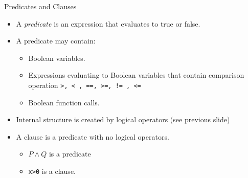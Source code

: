 \documentclass{beamer}
\begin{document}
\begin{frame}[fragile]{Predicates and Clauses}
  \begin{itemize}
  \item A {\em predicate} is an expression that evaluates to true or
    false.
   \item A predicate may contain:
     \begin{itemize}
     \item Boolean variables.
     \item Expressions evaluating to  Boolean variables that contain
       comparison operation {\tt >, < , ==, >=, != , <=}
     \item  Boolean function calls.
     \end{itemize}
   \item Internal structure is created by logical operators (see
     previous slide)
   \item A clause is a predicate with no logical operators.
     \begin{itemize}
     \item $P \land Q$ is a predicate
     \item \verb+x>0+ is a clause. 
     \end{itemize}
  \end{itemize}
\end{frame}
\end{document}
